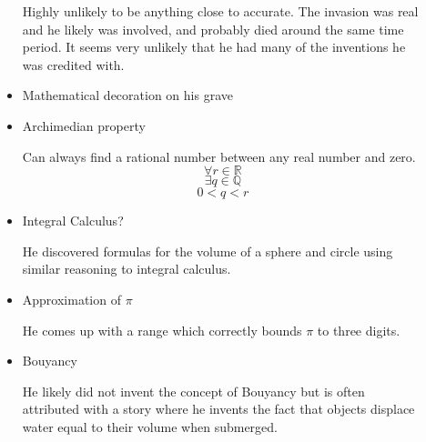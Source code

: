 \documentclass{report}
\begin{document}
\begin{description}
\begin{mdframed}
\begin{itemize}
\begin{mdframed}
                        Highly unlikely to be anything close to
                        accurate. The invasion was real and he
                        likely was involved, and probably died
                        around the same time period. It seems
                        very unlikely that he had many of the
                        inventions he was credited with.
                    \end{mdframed}
                \item Mathematical decoration on his grave
                \item Archimedian property
                    \begin{mdframed}
                        Can always find a rational number between
                        any real number and zero.
                        \begin{displaymath}
                            \forall r \in \mathbb{R}
                        \end{displaymath}
                        \begin{displaymath}
                            \exists q \in \mathbb{Q}
                        \end{displaymath}
                        \begin{displaymath}
                            0 < q < r
                        \end{displaymath}
                    \end{mdframed}
                \item Integral Calculus?
                    \begin{mdframed}
                        He discovered formulas for the volume
                        of a sphere and circle using similar
                        reasoning to integral calculus.
                    \end{mdframed}
                \item Approximation of $\pi$
                     \begin{mdframed}
                        He comes up with a range which correctly
                        bounds $\pi$ to three digits.
                    \end{mdframed}
                \item Bouyancy
                    \begin{mdframed}
                        He likely did not invent the concept
                        of Bouyancy but is often attributed
                        with a story where he invents the
                        fact that objects displace water
                        equal to their volume when submerged.


\end{mdframed}
\end{itemize}
\end{mdframed}
\end{description}
\end{document}
